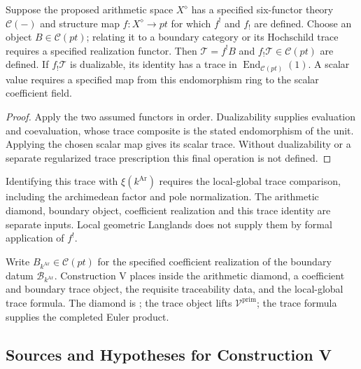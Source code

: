 \begin{proposition}
\label{v4-arith:w10-a:prop:six-fun-ACS}
Suppose the proposed arithmetic space $X^\diamond$ has a specified
six-functor theory $\mathcal C(-)$ and structure map $f:X^\diamond\to pt$
for which $f^!$ and $f_!$ are defined. Choose an object
$B\in\mathcal C(pt)$; relating it to a boundary category or its
Hochschild trace requires a specified realization functor.
Then $\mathcal T=f^!B$ and $f_!\mathcal T\in\mathcal C(pt)$ are defined.
If $f_!\mathcal T$ is dualizable, its identity has a trace in
$\operatorname{End}_{\mathcal C(pt)}(1)$.
A scalar value requires a specified map from this endomorphism ring
to the scalar coefficient field.
\end{proposition}
\begin{proof}
Apply the two assumed functors in order. Dualizability supplies
evaluation and coevaluation, whose trace composite is the stated
endomorphism of the unit. Applying the chosen scalar map gives
its scalar trace. Without dualizability or a separate regularized
trace prescription this final operation is not defined.
\end{proof}
Identifying this trace with $\xi(k^{\mathrm{Ar}})$ requires the
local-global trace comparison, including the archimedean factor
and pole normalization. The arithmetic diamond, boundary object,
coefficient realization and this trace identity are separate inputs.
Local geometric Langlands does not supply them by formal application
of $f^!$.

\begin{remark}
\label{v4-arith:w10-a:rem:construction-V-form}
Write $B_{k^{\mathrm{Ar}}}\in\mathcal C(pt)$ for the specified coefficient realization of the boundary datum $\mathscr B_{k^{\mathrm{Ar}}}$. Construction V places  inside
the arithmetic diamond, a coefficient and boundary trace object,
the requisite traceability data, and
the local-global trace formula. The diamond is
; the trace object lifts
\(\mathcal V^{\mathrm{prim}}\); the trace formula supplies the completed
Euler product.
\end{remark}

\subsection{Sources and Hypotheses for Construction V}
\label{v4-arith:w10-a:ah:construction-V}

